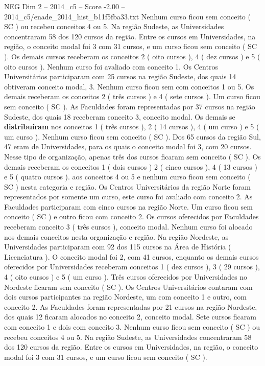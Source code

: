 \begin{textsample}{NEG Dim 2 – 2014\_c5 – Score -2.00 – 2014\_c5/enade\_2014\_hist\_b11f5fba33.txt}
Nenhum curso ficou sem conceito ( SC ) ou recebeu conceitos 4 ou 5.
Na região Sudeste, as Universidades concentraram 58 dos 120 cursos da região.
Entre os cursos em Universidades, na região, o conceito modal foi 3 com 31 cursos, e um curso ficou sem conceito ( SC ).
Os demais cursos receberam os conceitos 2 ( oito cursos ), 4 ( dez cursos ) e 5 ( oito cursos ).
Nenhum curso foi avaliado com conceito 1.
Os Centros Universitários participaram com 25 cursos na região Sudeste, dos quais 14 obtiveram conceito modal, 3.
Nenhum curso ficou sem com conceitos 1 ou 5.
Os demais receberam os conceitos 2 ( três cursos ) e 4 ( sete cursos ).
Um curso ficou sem conceito ( SC ).
As Faculdades foram representadas por 37 cursos na região Sudeste, dos quais 18 receberam conceito 3, conceito modal.
Os demais se \textbf{distribuíram} nos conceitos 1 ( três cursos ), 2 ( 14 cursos ), 4 ( um curso ) e 5 ( um curso ).
Nenhum curso ficou sem conceito ( SC ).
Dos 65 cursos da região Sul, 47 eram de Universidades, para os quais o conceito modal foi 3, com 20 cursos.
Nesse tipo de organização, apenas três dos cursos ficaram sem conceito ( SC ).
Os demais receberam os conceitos 1 ( dois cursos ) 2 ( cinco cursos ), 4 ( 13 cursos ) e 5 ( quatro cursos ). aos conceitos 4 ou 5 e nenhum curso ficou sem conceito ( SC ) nesta categoria e região.
Os Centros Universitários da região Norte foram representados por somente um curso, este curso foi avaliado com conceito 2.
As Faculdades participaram com cinco cursos na região Norte.
Um curso ficou sem conceito ( SC ) e outro ficou com conceito 2.
Os cursos oferecidos por Faculdades receberam conceito 3 ( três cursos ), conceito modal.
Nenhum curso foi alocado nos demais conceitos nesta organização e região.
Na região Nordeste, as Universidades participaram com 92 dos 115 cursos na Área de História ( Licenciatura ).
O conceito modal foi 2, com 41 cursos, enquanto os demais cursos oferecidos por Universidades receberam conceitos 1 ( dez cursos ), 3 ( 29 cursos ), 4 ( oito cursos ) e 5 ( um curso ).
Três cursos oferecidos por Universidades no Nordeste ficaram sem conceito ( SC ).
Os Centros Universitários contaram com dois cursos participantes na região Nordeste, um com conceito 1 e outro, com conceito 2.
As Faculdades foram representadas por 21 cursos na região Nordeste, dos quais 12 ficaram alocados no conceito 2, conceito modal.
Sete cursos ficaram com conceito 1 e dois com conceito 3.
Nenhum curso ficou sem conceito ( SC ) ou recebeu conceitos 4 ou 5.
Na região Sudeste, as Universidades concentraram 58 dos 120 cursos da região.
Entre os cursos em Universidades, na região, o conceito modal foi 3 com 31 cursos, e um curso ficou sem conceito ( SC ).

\end{textsample}
